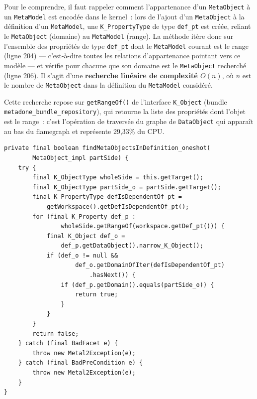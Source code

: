 Pour le comprendre, il faut rappeler comment l'appartenance d'un \texttt{MetaObject} à un \texttt{MetaModel} est encodée dans le kernel~: lors de l'ajout d'un \texttt{MetaObject} à la définition d'un \texttt{MetaModel}, une \texttt{K\_PropertyType} de type \texttt{def\_pt} est créée, reliant le \texttt{MetaObject} (domaine)
au \texttt{MetaModel} (range). La méthode itère donc sur l'ensemble des
propriétés de type \texttt{def\_pt} dont le \texttt{MetaModel} courant est
le range (ligne 204) --- c'est-à-dire toutes les relations d'appartenance
pointant vers ce modèle --- et vérifie pour chacune que son domaine est le
\texttt{MetaObject} recherché (ligne 206). Il s'agit d'une \textbf{recherche
linéaire de complexité $O(n)$}, où $n$ est le nombre de \texttt{MetaObject}
dans la définition du \texttt{MetaModel} considéré.

Cette recherche repose sur \texttt{getRangeOf()} de l'interface
\texttt{K\_Object} (bundle \texttt{metadone\_bundle\_repository}), qui retourne la liste des propriétés dont
l'objet est le range~: c'est l'opération de traversée du graphe de
\texttt{DataObject} qui apparaît au bas du flamegraph et représente
29,33\% du CPU.

\begin{lstlisting}[firstnumber=199,
  caption={Méthode \texttt{findMetaObjectsInDefinition\_oneshot} ---
  classe \texttt{MetaModel\_impl},
  bundle \texttt{metadone\_bundle\_metabusiness}},
  label={ls-oneshot}]
private final boolean findMetaObjectsInDefinition_oneshot(
        MetaObject_impl partSide) {
    try {
        final K_ObjectType wholeSide = this.getTarget();
        final K_ObjectType partSide_o = partSide.getTarget();
        final K_PropertyType defIsDependentOf_pt =
            getWorkspace().getDefIsDependentOf_pt();
        for (final K_Property def_p :
                wholeSide.getRangeOf(workspace.getDef_pt())) {
            final K_Object def_o =
                def_p.getDataObject().narrow_K_Object();
            if (def_o != null &&
                    def_o.getDomainOfIter(defIsDependentOf_pt)
                        .hasNext()) {
                if (def_p.getDomain().equals(partSide_o)) {
                    return true;
                }
            }
        }
        return false;
    } catch (final BadFacet e) {
        throw new Metal2Exception(e);
    } catch (final BadPreCondition e) {
        throw new Metal2Exception(e);
    }
}
\end{lstlisting}

